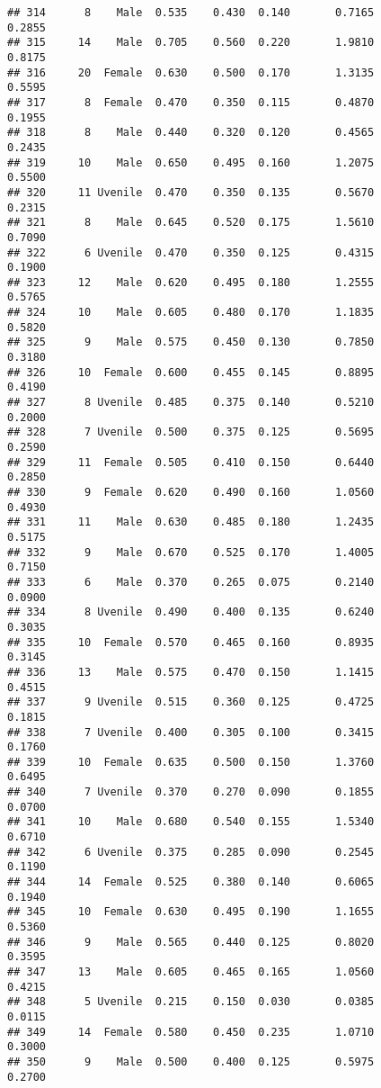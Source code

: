 \documentclass[
]{article}
\begin{document}
\begin{verbatim}
## 314      8    Male  0.535    0.430  0.140       0.7165         0.2855
## 315     14    Male  0.705    0.560  0.220       1.9810         0.8175
## 316     20  Female  0.630    0.500  0.170       1.3135         0.5595
## 317      8  Female  0.470    0.350  0.115       0.4870         0.1955
## 318      8    Male  0.440    0.320  0.120       0.4565         0.2435
## 319     10    Male  0.650    0.495  0.160       1.2075         0.5500
## 320     11 Uvenile  0.470    0.350  0.135       0.5670         0.2315
## 321      8    Male  0.645    0.520  0.175       1.5610         0.7090
## 322      6 Uvenile  0.470    0.350  0.125       0.4315         0.1900
## 323     12    Male  0.620    0.495  0.180       1.2555         0.5765
## 324     10    Male  0.605    0.480  0.170       1.1835         0.5820
## 325      9    Male  0.575    0.450  0.130       0.7850         0.3180
## 326     10  Female  0.600    0.455  0.145       0.8895         0.4190
## 327      8 Uvenile  0.485    0.375  0.140       0.5210         0.2000
## 328      7 Uvenile  0.500    0.375  0.125       0.5695         0.2590
## 329     11  Female  0.505    0.410  0.150       0.6440         0.2850
## 330      9  Female  0.620    0.490  0.160       1.0560         0.4930
## 331     11    Male  0.630    0.485  0.180       1.2435         0.5175
## 332      9    Male  0.670    0.525  0.170       1.4005         0.7150
## 333      6    Male  0.370    0.265  0.075       0.2140         0.0900
## 334      8 Uvenile  0.490    0.400  0.135       0.6240         0.3035
## 335     10  Female  0.570    0.465  0.160       0.8935         0.3145
## 336     13    Male  0.575    0.470  0.150       1.1415         0.4515
## 337      9 Uvenile  0.515    0.360  0.125       0.4725         0.1815
## 338      7 Uvenile  0.400    0.305  0.100       0.3415         0.1760
## 339     10  Female  0.635    0.500  0.150       1.3760         0.6495
## 340      7 Uvenile  0.370    0.270  0.090       0.1855         0.0700
## 341     10    Male  0.680    0.540  0.155       1.5340         0.6710
## 342      6 Uvenile  0.375    0.285  0.090       0.2545         0.1190
## 344     14  Female  0.525    0.380  0.140       0.6065         0.1940
## 345     10  Female  0.630    0.495  0.190       1.1655         0.5360
## 346      9    Male  0.565    0.440  0.125       0.8020         0.3595
## 347     13    Male  0.605    0.465  0.165       1.0560         0.4215
## 348      5 Uvenile  0.215    0.150  0.030       0.0385         0.0115
## 349     14  Female  0.580    0.450  0.235       1.0710         0.3000
## 350      9    Male  0.500    0.400  0.125       0.5975         0.2700

\end{verbatim}
\end{document}

